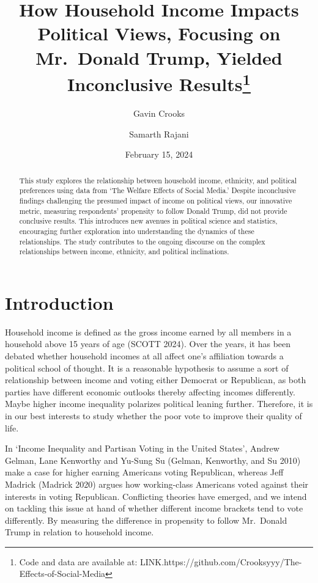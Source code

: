 \documentclass[
  letterpaper,
  DIV=11,
  numbers=noendperiod]{scrartcl}
\title{How Household Income Impacts Political Views, Focusing on
Mr.~Donald Trump, Yielded Inconclusive Results\thanks{Code and data are
available at:
LINK.https://github.com/Crooksyyy/The-Effects-of-Social-Media}}
\author{Gavin Crooks \and Samarth Rajani}
\date{February 15, 2024}
\renewcommand*\contentsname{Table of contents}
\newcommand\contentsname{Table of contents}
\begin{document}
\maketitle
\begin{abstract}
This study explores the relationship between household income,
ethnicity, and political preferences using data from `The Welfare
Effects of Social Media.' Despite inconclusive findings challenging the
presumed impact of income on political views, our innovative metric,
measuring respondents' propensity to follow Donald Trump, did not
provide conclusive results. This introduces new avenues in political
science and statistics, encouraging further exploration into
understanding the dynamics of these relationships. The study contributes
to the ongoing discourse on the complex relationships between income,
ethnicity, and political inclinations.
\end{abstract}

\renewcommand*\contentsname{Table of contents}
{
\hypersetup{linkcolor=}
\setcounter{tocdepth}{3}
\tableofcontents
}
\section{Introduction}\label{sec-intro}

Household income is defined as the gross income earned by all members in
a household above 15 years of age (SCOTT 2024). Over the years, it has
been debated whether household incomes at all affect one's affiliation
towards a political school of thought. It is a reasonable hypothesis to
assume a sort of relationship between income and voting either Democrat
or Republican, as both parties have different economic outlooks thereby
affecting incomes differently. Maybe higher income inequality polarizes
political leaning further. Therefore, it is in our best interests to
study whether the poor vote to improve their quality of life.

In `Income Inequality and Partisan Voting in the United States', Andrew
Gelman, Lane Kenworthy and Yu-Sung Su (Gelman, Kenworthy, and Su 2010)
make a case for higher earning Americans voting Republican, whereas Jeff
Madrick (Madrick 2020) argues how working-class Americans voted against
their interests in voting Republican. Conflicting theories have emerged,
and we intend on tackling this issue at hand of whether different income
brackets tend to vote differently. By measuring the difference in
propensity to follow Mr.~Donald Trump in relation to household income.
\end{document}
